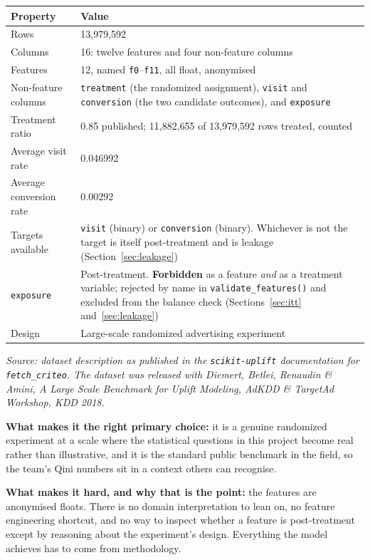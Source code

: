 \documentclass[11pt,a4paper]{article}
\newcommand{\srcnote}[1]{{\footnotesize\itshape\color{teal}Source: #1}}
\begin{document}
\begin{tabularx}{\textwidth}{@{}L{4.4cm}X@{}}
\toprule
\textbf{Property} & \textbf{Value} \\
\midrule
Rows & 13{,}979{,}592 \\
Columns & 16: twelve features and four non-feature columns \\
Features & 12, named \texttt{f0}--\texttt{f11}, all float, anonymised \\
Non-feature columns & \texttt{treatment} (the randomized assignment), \texttt{visit} and
\texttt{conversion} (the two candidate outcomes), and \texttt{exposure} \\
Treatment ratio & 0.85 published; 11{,}882{,}655 of 13{,}979{,}592 rows treated, counted \\
Average visit rate & 0.046992 \\
Average conversion rate & 0.00292 \\
Targets available & \texttt{visit} (binary) or \texttt{conversion} (binary). Whichever is not the
target is itself post-treatment and is leakage (Section~\ref{sec:leakage}) \\
\texttt{exposure} & Post-treatment. \textbf{Forbidden} as a feature \emph{and} as a treatment
variable; rejected by name in \texttt{validate\_features()} and excluded from the balance check
(Sections~\ref{sec:itt} and~\ref{sec:leakage}) \\
Design & Large-scale randomized advertising experiment \\
\bottomrule
\end{tabularx}

\srcnote{dataset description as published in the \texttt{scikit-uplift} documentation for
\texttt{fetch\_criteo}. The dataset was released with Diemert, Betlei, Renaudin \& Amini,
\emph{A Large Scale Benchmark for Uplift Modeling}, AdKDD \& TargetAd Workshop, KDD 2018.}

\textbf{What makes it the right primary choice:} it is a genuine randomized experiment at a scale
where the statistical questions in this project become real rather than illustrative, and it is
the standard public benchmark in the field, so the team's Qini numbers sit in a context others can
recognise.

\textbf{What makes it hard, and why that is the point:} the features are anonymised floats. There
is no domain interpretation to lean on, no feature engineering shortcut, and no way to inspect
whether a feature is post-treatment except by reasoning about the experiment's design. Everything
the model achieves has to come from methodology.
\end{document}
